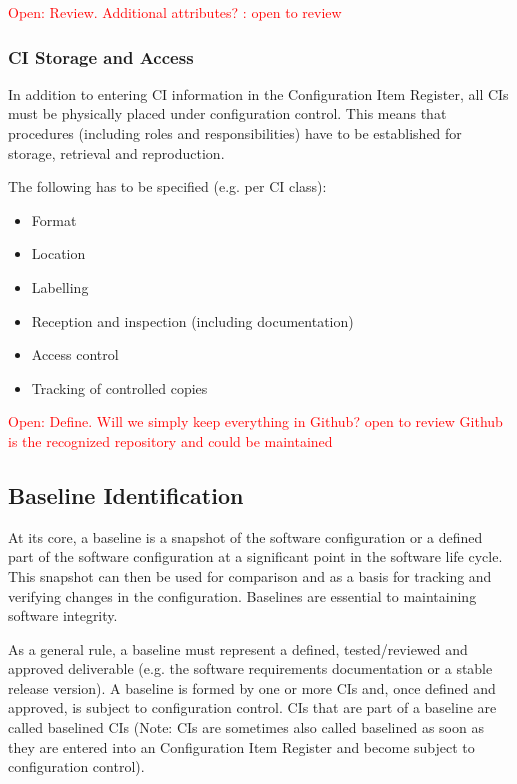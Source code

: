 \documentclass{template/openetcs_report}
\begin{document}
\textcolor{red}{Open: Review. Additional attributes? : open to review}


\subsubsection{CI Storage and Access} %
\label{sec:CI Storage and Access}

In addition to entering CI information in the Configuration Item Register, all CIs must be physically placed under configuration control. This means that procedures (including roles and responsibilities) have to be established for storage, retrieval and reproduction.

The following has to be specified (e.g. per CI class):

\vspace{-10pt}
\begin{itemize}
\item Format
\item Location
\item Labelling
\item Reception and inspection (including documentation)
\item Access control
\item Tracking of controlled copies
\end{itemize}

\textcolor{red}{Open: Define. Will we simply keep everything in Github? open to review Github is the recognized repository and could be maintained}


\subsection{Baseline Identification} %
\label{sec:Baseline Identification}

At its core, a baseline is a snapshot of the software configuration or a defined part of the software configuration at a significant point in the software life cycle. This snapshot can then be used for comparison and as a basis for tracking and verifying changes in the configuration. Baselines are essential to maintaining software integrity.

As a general rule, a baseline must represent a defined, tested/reviewed and approved deliverable (e.g. the software requirements documentation or a stable release version). A baseline is formed by one or more CIs and, once defined and approved, is subject to configuration control. CIs that are part of a baseline are called baselined CIs (Note: CIs are sometimes also called baselined as soon as they are entered into an Configuration Item Register and become subject to configuration control).
\end{document}
